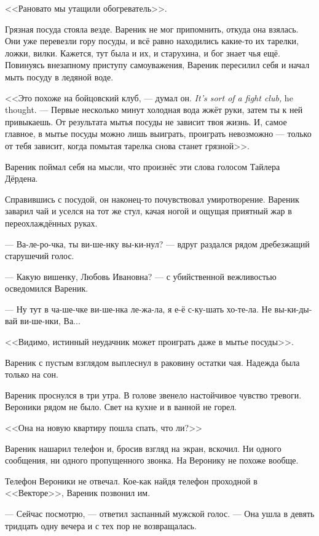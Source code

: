 <<Рановато мы утащили обогреватель>>.

Грязная посуда стояла везде.
Вареник не мог припомнить, откуда она взялась.
Они уже перевезли гору посуды, и всё равно находились какие-то их тарелки, ложки, вилки.
Кажется, тут была и их, и старухина, и бог знает чья ещё.
Повинуясь внезапному приступу самоуважения, Вареник пересилил себя и начал мыть посуду в ледяной воде.

{<<Это похоже на бойцовский клуб, --- думал он.}
{\textit{It's sort of a fight club,} he thought.}
--- Первые несколько минут холодная вода жжёт руки, затем ты к ней привыкаешь.
От результата мытья посуды не зависит твоя жизнь.
И, самое главное, в мытье посуды можно лишь выиграть, проиграть невозможно --- только от тебя зависит, когда помытая тарелка снова станет грязной>>.

Вареник поймал себя на мысли, что произнёс эти слова голосом Тайлера Дёрдена.

Справившись с посудой, он наконец-то почувствовал умиротворение.
Вареник заварил чай и уселся на тот же стул, качая ногой и ощущая приятный жар в переохлаждённых руках.

--- Ва-ле-ро-чка, ты ви-ше-нку вы-ки-нул? --- вдруг раздался рядом дребезжащий старушечий голос.

--- Какую вишенку, Любовь Ивановна? --- с убийственной вежливостью осведомился Вареник.

--- Ну тут в ча-ше-чке ви-ше-нка ле-жа-ла, я е-ё с-ку-шать хо-те-ла.
Не вы-ки-ды-вай ви-ше-нки, Ва...

<<Видимо, истинный неудачник может проиграть даже в мытье посуды>>.

Вареник с пустым взглядом выплеснул в раковину остатки чая.
Надежда была только на сон.

\asterism

Вареник проснулся в три утра.
В голове звенело настойчивое чувство тревоги.
Вероники рядом не было.
Свет на кухне и в ванной не горел.

<<Она на новую квартиру пошла спать, что ли?>>

Вареник нашарил телефон и, бросив взгляд на экран, вскочил.
Ни одного сообщения, ни одного пропущенного звонка.
На Веронику не похоже вообще.

Телефон Вероники не отвечал.
Кое-как найдя телефон проходной в <<Векторе>>, Вареник позвонил им.

--- Сейчас посмотрю, --- ответил заспанный мужской голос.
--- Она ушла в девять тридцать одну вечера и с тех пор не возвращалась.

